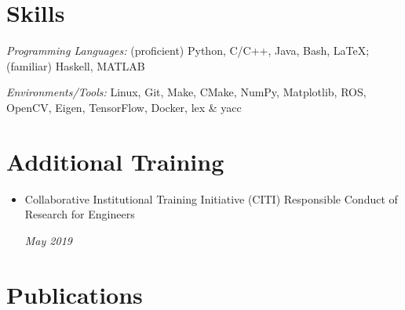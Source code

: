 \documentclass[\ifdefined\cv11pt\else10pt\fi,letterpaper,roman]{moderncv}
\def\cv{}
\newcommand{\cvonly}[1]{\ifdefined\cv#1\fi}
\renewcommand{\cvitem}[2]{\item {#1}\hfill\textit{#2}}
\let\oldsection\section
\renewcommand{\section}[1]{\vspace*{-1.3ex}\oldsection{#1}\vspace*{-0.5ex}}
\begin{document}
	\setlength{\premulticols}{0pt}
	\section{Skills}
	\textit{Programming Languages:} (proficient) Python, C/C++, Java, Bash, \LaTeX; (familiar) Haskell, MATLAB \par
	\textit{Environments/Tools:} Linux, Git, Make, CMake, NumPy, Matplotlib, ROS, OpenCV, Eigen, TensorFlow, Docker, lex \& yacc \par
	
	\cvonly{
		\section{Additional Training}
		\begin{itemize}
			\cvitem{
				\parbox[t]{0.85\linewidth}{Collaborative Institutional Training Initiative (CITI) Responsible Conduct of Research for Engineers}}{May 2019}
		\end{itemize}
	}
	
	
	\section{Publications}
	\nocite{damron2019,marios_trajopt}
	\printbibliography[heading=none]{}
\end{document}
